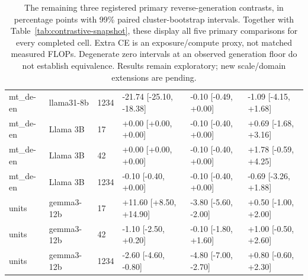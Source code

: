\begin{table}[t]
\begin{tabular}{llllll}
mt\_de-en & llama31-8b & 1234 & -21.74 [-25.10, -18.38] & -0.10 [-0.49, +0.00] & -1.09 [-4.15, +1.68] \\
mt\_de-en & Llama 3B & 17 & +0.00 [+0.00, +0.00] & -0.10 [-0.40, +0.00] & +0.69 [-1.68, +3.16] \\
mt\_de-en & Llama 3B & 42 & +0.00 [+0.00, +0.00] & -0.10 [-0.40, +0.00] & +1.78 [-0.59, +4.25] \\
mt\_de-en & Llama 3B & 1234 & -0.10 [-0.40, +0.00] & -0.10 [-0.40, +0.00] & -0.69 [-3.26, +1.88] \\
units & gemma3-12b & 17 & +11.60 [+8.50, +14.90] & -3.80 [-5.60, -2.00] & +0.50 [-1.00, +2.00] \\
units & gemma3-12b & 42 & -1.10 [-2.50, +0.20] & -0.10 [-1.80, +1.60] & +1.00 [-0.50, +2.60] \\
units & gemma3-12b & 1234 & -2.60 [-4.60, -0.80] & -4.80 [-7.00, -2.70] & +0.80 [-0.60, +2.30] \\
\bottomrule
\end{tabular}
\caption{The remaining three registered primary reverse-generation contrasts, in percentage points with 99\% paired cluster-bootstrap intervals. Together with Table~\ref{tab:contrastive-snapshot}, these display all five primary comparisons for every completed cell. Extra CE is an exposure/compute proxy, not matched measured FLOPs. Degenerate zero intervals at an observed generation floor do not establish equivalence. Results remain exploratory; new scale/domain extensions are pending.}
\label{tab:contrastive-controls}
\end{table}
